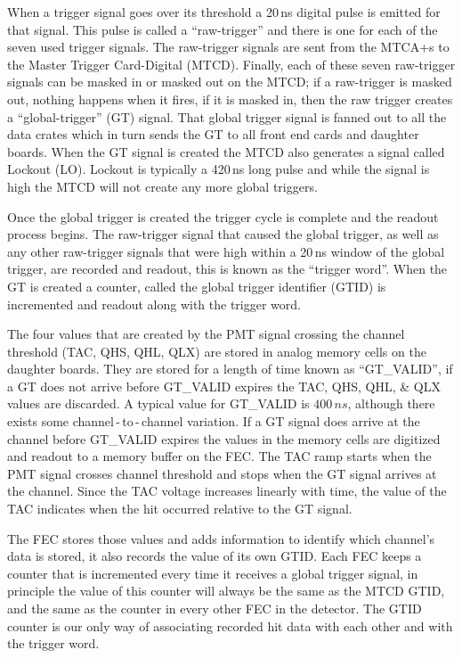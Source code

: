 When a trigger signal goes over its threshold a 20\,ns digital pulse is
emitted for that signal. This pulse is called a ``raw-trigger'' and there is
one for each of the seven used trigger signals.
The raw-trigger signals are sent from the MTCA+s to the Master Trigger
Card-Digital (MTCD).
Finally, each of these seven raw-trigger signals can be masked in or masked out on
the MTCD\@;
if a raw-trigger is masked out, nothing happens when it fires,
if it is masked in, then the raw trigger creates a ``global-trigger'' (GT) signal.
That global trigger signal is fanned out to all the data crates which
in turn sends the GT to all front end cards and daughter boards.
When the GT signal is created the MTCD also generates a signal
called Lockout (LO). Lockout is typically a 420\,ns long pulse and while
the signal is high the MTCD will not create any more global triggers.

Once the global trigger is created the trigger cycle is complete and
the readout process begins.
The raw-trigger signal that caused the global trigger, as well as any other
raw-trigger signals that were high within a 20\,ns window of the global trigger,
are recorded and readout, this is known as the ``trigger word''.
When the GT is created a counter, called the global trigger identifier (GTID) is incremented
and readout along with the trigger word.

The four values that are created by the PMT signal crossing
the channel threshold (TAC, QHS, QHL, QLX) are stored in analog memory
cells on the daughter boards.
They are stored for a length of time known as ``GT\_VALID'', if
a GT does not arrive before GT\_VALID expires the TAC, QHS, QHL, \& QLX values
are discarded. A typical value for GT\_VALID is $400\,ns$, although
there exists some channel\,-\,to\,-\,channel variation.
If a GT signal does arrive at the channel before GT\_VALID expires the
values in the memory cells are digitized and readout to a memory buffer
on the FEC\@.
The TAC ramp starts when the PMT signal crosses channel threshold
and stops when the GT signal arrives at the channel.
Since the TAC voltage increases linearly with time, the value of the TAC
indicates when the hit occurred relative to the GT signal.

The FEC stores those values and adds information to identify which
channel's data is stored, it also records the value of its own GTID\@.
Each FEC keeps a counter that is incremented every time it receives a global
trigger signal, in principle the value of this counter will always be the same
as the MTCD GTID, and the same as the counter in every other FEC in the detector.
The GTID counter is our only way of associating recorded hit data with each other
and with the trigger word.

